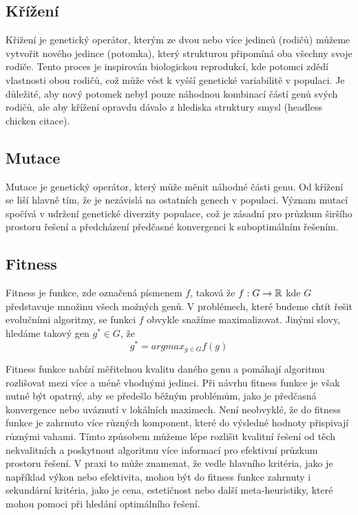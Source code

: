 \subsection{Křížení}
Křižení je genetický operátor, kterým ze dvou nebo více jedinců (rodičů) můžeme vytvořit nového jedince (potomka), který strukturou připomíná oba všechny svoje rodiče. Tento proces je inspirován biologickou reprodukcí, kde potomci zdědí vlastnosti obou rodičů, což může vést k vyšší genetické variabilitě v populaci. Je důležité, aby nový potomek nebyl pouze náhodnou kombinací částí genů svých rodičů, ale aby křížení opravdu dávalo z hlediska struktury smysl (headless chicken citace).

\subsection{Mutace}
Mutace je genetický operátor, který může měnit náhodné části genu. Od křížení se liší hlavně tím, že je nezávislá na ostatních genech v populaci. Význam mutací spočívá v udržení genetické diverzity populace, což je zásadní pro průzkum širšího prostoru řešení a předcházení předčasné konvergenci k suboptimálním řešením.

\subsection{Fitness}
Fitness je funkce, zde označená písmenem $f$, taková že $f: G \rightarrow \mathbb{R}$ kde $G$ představuje množinu všech možných genů. V problémech, které budeme chtít řešit evolučními algoritmy, se funkci $f$ obvykle snažíme maximalizovat. Jinými slovy, hledáme takový gen $g^* \in G$, že 
$$g^* = argmax_{g \in G} f(g)$$

Fitness funkce nabízí měřitelnou kvalitu daného genu a pomáhají algoritmu rozlišovat mezi více a méně vhodnými jedinci. Při návrhu fitness funkce je však nutné být opatrný, aby se předešlo běžným problémům, jako je předčasná konvergence nebo uváznutí v lokálních maximech. Není neobvyklé, že do fitness funkce je zahrnuto více různých komponent, které do výsledné hodnoty přispivají různými vahami. Tímto způsobem můžeme lépe rozlišit kvalitní řešení od těch nekvalitních a poskytnout algoritmu více informací pro efektivní průzkum prostoru řešení. V praxi to může znamenat, že vedle hlavního kritéria, jako je například výkon nebo efektivita, mohou být do fitness funkce zahrnuty i sekundární kritéria, jako je cena, estetičnost nebo další meta-heuristiky, které mohou pomoci při hledání optimálního řešení.

